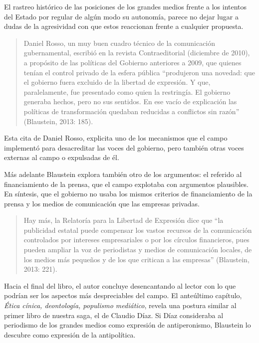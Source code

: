 {El rastreo histórico de las posiciones de los grandes medios frente a los intentos del Estado por regular de algún modo su autonomía, parece no dejar lugar a dudas de la agresividad con que estos reaccionan frente a cualquier propuesta.

\begin{quote}
Daniel Rosso, un muy buen cuadro técnico de la comunicación gubernamental, escribió en la revista Contraeditorial (diciembre de 2010), a propósito de las políticas del Gobierno anteriores a 2009, que quienes tenían el control privado de la esfera pública ``produjeron una novedad: que el gobierno fuera excluido de la libertad de expresión. Y que, paralelamente, fue presentado como quien la restringía. El gobierno generaba hechos, pero no sus sentidos. En ese vacío de explicación las políticas de transformación quedaban reducidas a conflictos sin razón'' (Blaustein, 2013: 185).
\end{quote}

Esta cita de Daniel Rosso, explicita uno de los mecanismos que el campo implementó para desacreditar las voces del gobierno, pero también otras voces externas al campo o expulsadas de él.

Más adelante Blaustein explora también otro de los argumentos: el referido al financiamiento de la prensa, que el campo explotaba con argumentos plausibles. En síntesis, que el gobierno no usaba los mismos criterios de financiamiento de la prensa y los medios de comunicación que las empresas privadas.

\begin{quote}
Hay más, la Relatoría para la Libertad de Expresión dice que ``la publicidad estatal puede compensar los vastos recursos de la comunicación controlados por intereses empresariales o por los círculos financieros, pues pueden ampliar la voz de periodistas y medios de comunicación locales, de los medios más pequeños y de los que critican a las empresas'' (Blaustein, 2013: 221).
\end{quote}

Hacia el final del libro, el autor concluye desencantando al lector con lo que podrían ser los aspectos más despreciables del campo. El anteúltimo capítulo, \emph{Ética cínica, deontología, populismo mediático}, revela una postura similar al primer libro de nuestra saga, el de Claudio Díaz. Si Díaz consideraba al periodismo de los grandes medios como expresión de antiperonismo, Blaustein lo descubre como expresión de la antipolítica.

}
